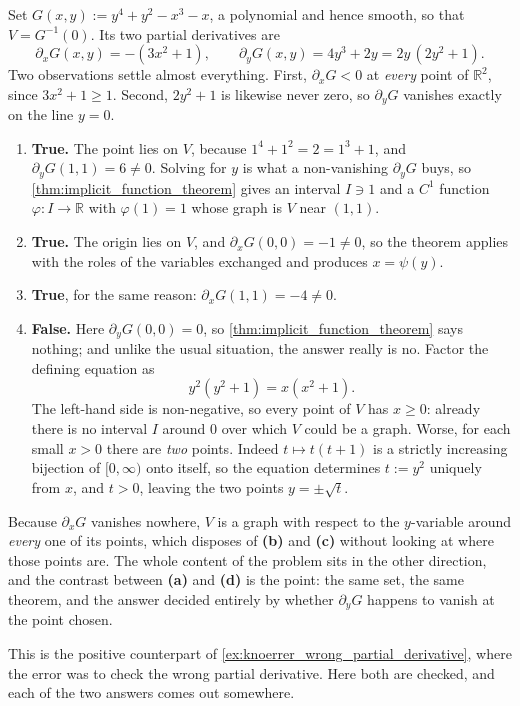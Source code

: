 \begin{exercisesolution}
\label{sol:graph_over_which_variable}
Set $G(x,y) := y^4+y^2-x^3-x$, a polynomial and hence smooth, so that $V = G^{-1}(0)$. Its two
partial derivatives are
\[\partial_x G(x,y) = -(3x^2+1), \qquad
  \partial_y G(x,y) = 4y^3+2y = 2y\,(2y^2+1).\]
Two observations settle almost everything. First, $\partial_x G < 0$ at \emph{every} point of
$\mathbb{R}^2$, since $3x^2+1 \geq 1$. Second, $2y^2+1$ is likewise never zero, so
$\partial_y G$ vanishes exactly on the line $y = 0$.
\begin{enumerate}[label=\textbf{(\alph*)}]
  \item \textbf{True.} The point lies on $V$, because $1^4+1^2 = 2 = 1^3+1$, and
    $\partial_y G(1,1) = 6 \neq 0$. Solving for $y$ is what a non-vanishing $\partial_y G$ buys,
    so \cref{thm:implicit_function_theorem} gives an interval $I \ni 1$ and a $C^1$ function
    $\varphi : I \to \mathbb{R}$ with $\varphi(1) = 1$ whose graph is $V$ near $(1,1)$.
  \item \textbf{True.} The origin lies on $V$, and $\partial_x G(0,0) = -1 \neq 0$, so the
    theorem applies with the roles of the variables exchanged and produces $x = \psi(y)$.
  \item \textbf{True}, for the same reason: $\partial_x G(1,1) = -4 \neq 0$.
  \item \textbf{False.} Here $\partial_y G(0,0) = 0$, so \cref{thm:implicit_function_theorem}
    says nothing; and unlike the usual situation, the answer really is no. Factor the defining
    equation as
    \[y^2(y^2+1) = x(x^2+1).\]
    The left-hand side is non-negative, so every point of $V$ has $x \geq 0$: already there is
    no interval $I$ around $0$ over which $V$ could be a graph. Worse, for each small $x > 0$
    there are \emph{two} points. Indeed $t \mapsto t(t+1)$ is a strictly increasing bijection of
    $[0,\infty)$ onto itself, so the equation determines $t := y^2$ uniquely from $x$, and
    $t > 0$, leaving the two points $y = \pm\sqrt{t}$.
\end{enumerate}

\begin{remark}
Because $\partial_x G$ vanishes nowhere, $V$ is a graph with respect to the $y$-variable around
\emph{every} one of its points, which disposes of \textbf{(b)} and \textbf{(c)} without looking
at where those points are. The whole content of the problem sits in the other direction, and the
contrast between \textbf{(a)} and \textbf{(d)} is the point: the same set, the same theorem, and
the answer decided entirely by whether $\partial_y G$ happens to vanish at the point chosen.

This is the positive counterpart of \cref{ex:knoerrer_wrong_partial_derivative}, where the error
was to check the wrong partial derivative. Here both are checked, and each of the two answers
comes out somewhere.
\end{remark}
\end{exercisesolution}
